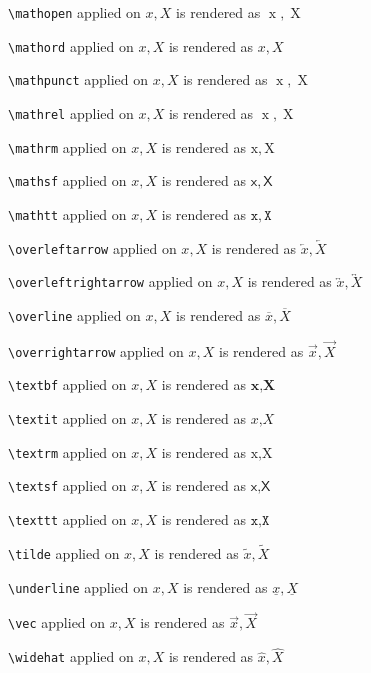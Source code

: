 \texttt{\textbackslash mathopen} applied on $x,X$ is rendered as $\mathopen{x},\mathopen{X}$


\texttt{\textbackslash mathord} applied on $x,X$ is rendered as $\mathord{x},\mathord{X}$


\texttt{\textbackslash mathpunct} applied on $x,X$ is rendered as $\mathpunct{x},\mathpunct{X}$


\texttt{\textbackslash mathrel} applied on $x,X$ is rendered as $\mathrel{x},\mathrel{X}$


\texttt{\textbackslash mathrm} applied on $x,X$ is rendered as $\mathrm{x},\mathrm{X}$


\texttt{\textbackslash mathsf} applied on $x,X$ is rendered as $\mathsf{x},\mathsf{X}$


\texttt{\textbackslash mathtt} applied on $x,X$ is rendered as $\mathtt{x},\mathtt{X}$


\texttt{\textbackslash overleftarrow} applied on $x,X$ is rendered as $\overleftarrow{x},\overleftarrow{X}$


\texttt{\textbackslash overleftrightarrow} applied on $x,X$ is rendered as $\overleftrightarrow{x},\overleftrightarrow{X}$


\texttt{\textbackslash overline} applied on $x,X$ is rendered as $\overline{x},\overline{X}$


\texttt{\textbackslash overrightarrow} applied on $x,X$ is rendered as $\overrightarrow{x},\overrightarrow{X}$


\texttt{\textbackslash textbf} applied on $x,X$ is rendered as $\textbf{x},\textbf{X}$


\texttt{\textbackslash textit} applied on $x,X$ is rendered as $\textit{x},\textit{X}$


\texttt{\textbackslash textrm} applied on $x,X$ is rendered as $\textrm{x},\textrm{X}$


\texttt{\textbackslash textsf} applied on $x,X$ is rendered as $\textsf{x},\textsf{X}$


\texttt{\textbackslash texttt} applied on $x,X$ is rendered as $\texttt{x},\texttt{X}$


\texttt{\textbackslash tilde} applied on $x,X$ is rendered as $\tilde{x},\tilde{X}$


\texttt{\textbackslash underline} applied on $x,X$ is rendered as $\underline{x},\underline{X}$


\texttt{\textbackslash vec} applied on $x,X$ is rendered as $\vec{x},\vec{X}$


\texttt{\textbackslash widehat} applied on $x,X$ is rendered as $\widehat{x},\widehat{X}$


